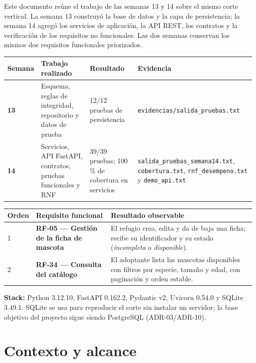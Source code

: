 \documentclass[11pt,a4paper]{article}
\newcommand{\code}[1]{\texttt{#1}}
\newcommand{\thead}[1]{\textbf{#1}}
\begin{document}
Este documento reúne el trabajo de las semanas 13 y 14 sobre el mismo corte
vertical. La semana 13 construyó la base de datos y la capa de persistencia; la
semana 14 agregó los servicios de aplicación, la API REST, los contratos y la
verificación de los requisitos no funcionales. Las dos semanas conservan los
mismos dos requisitos funcionales priorizados.

{\footnotesize
\begin{tabularx}{\linewidth}{@{}V{0.35}V{1.0}V{1.0}V{1.65}@{}}
\toprule
\thead{Semana} & \thead{Trabajo realizado} & \thead{Resultado} & \thead{Evidencia} \\ \midrule
\textbf{13} & Esquema, reglas de integridad, repositorio y datos de prueba &
12/12 pruebas de persistencia & \code{evidencias/salida\_pruebas.txt} \\
\textbf{14} & Servicios, API FastAPI, contratos, pruebas funcionales y RNF &
39/39 pruebas; 100\,\% de cobertura en servicios &
\code{salida\_pruebas\_semana14.txt}, \code{cobertura.txt},
\code{rnf\_desempeno.txt} y \code{demo\_api.txt} \\
\bottomrule
\end{tabularx}
}

\vspace{1mm}
{\footnotesize
\begin{tabularx}{\linewidth}{@{}V{0.3}V{1.2}V{1.5}@{}}
\toprule
\thead{Orden} & \thead{Requisito funcional} & \thead{Resultado observable} \\  & \textbf{RF-05 --- Gestión de la ficha de mascota} &
El refugio crea, edita y da de baja una ficha; recibe su identificador y su
estado (\emph{incompleta} o \emph{disponible}). \\
2 & \textbf{RF-34 --- Consulta del catálogo} &
El adoptante lista las mascotas disponibles con filtros por especie, tamaño y
edad, con paginación y orden estable. \\
\bottomrule
\end{tabularx}
}

\textbf{Stack:} Python 3.12.10, FastAPI 0.162.2, Pydantic v2, Uvicorn 0.54.0 y
SQLite 3.49.1. SQLite se usa para reproducir el corte sin instalar un servidor;
la base objetivo del proyecto sigue siendo PostgreSQL (ADR-03/ADR-10).

\section{Contexto y alcance}
\end{document}
